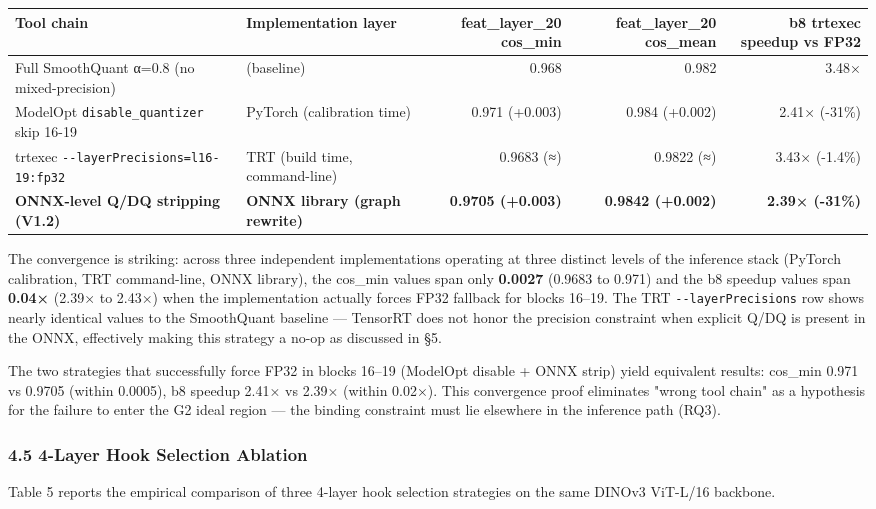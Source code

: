\documentclass[
]{article}
\newcounter{none} %
\begin{document}
{\def\LTcaptype{none} %
\begin{longtable}[]{@{}llrrr@{}}
\toprule\noalign{}
Tool chain & Implementation layer & feat\_layer\_20 cos\_min &
feat\_layer\_20 cos\_mean & b8 trtexec speedup vs FP32 \\
\midrule\noalign{}
\endhead
\bottomrule\noalign{}
\endlastfoot
Full SmoothQuant α=0.8 (no mixed-precision) & (baseline) & 0.968 & 0.982
& 3.48× \\
ModelOpt \texttt{disable\_quantizer} skip 16-19 & PyTorch (calibration
time) & 0.971 (+0.003) & 0.984 (+0.002) & 2.41× (-31\%) \\
trtexec \texttt{-\/-layerPrecisions=l16-19:fp32} & TRT (build time,
command-line) & 0.9683 (≈) & 0.9822 (≈) & 3.43× (-1.4\%) \\
\textbf{ONNX-level Q/DQ stripping (V1.2)} & \textbf{ONNX library (graph
rewrite)} & \textbf{0.9705 (+0.003)} & \textbf{0.9842 (+0.002)} &
\textbf{2.39× (-31\%)} \\
\end{longtable}
}

The convergence is striking: across three independent implementations
operating at three distinct levels of the inference stack (PyTorch
calibration, TRT command-line, ONNX library), the cos\_min values span
only \textbf{0.0027} (0.9683 to 0.971) and the b8 speedup values span
\textbf{0.04×} (2.39× to 2.43×) when the implementation actually forces
FP32 fallback for blocks 16--19. The TRT \texttt{-\/-layerPrecisions}
row shows nearly identical values to the SmoothQuant baseline ---
TensorRT does not honor the precision constraint when explicit Q/DQ is
present in the ONNX, effectively making this strategy a no-op as
discussed in §5.

The two strategies that successfully force FP32 in blocks 16--19
(ModelOpt disable + ONNX strip) yield equivalent results: cos\_min 0.971
vs 0.9705 (within 0.0005), b8 speedup 2.41× vs 2.39× (within 0.02×).
This convergence proof eliminates "wrong tool chain" as a hypothesis for
the failure to enter the G2 ideal region --- the binding constraint must
lie elsewhere in the inference path (RQ3).

\subsubsection{4.5 4-Layer Hook Selection
Ablation}\label{45-4-layer-hook-selection-ablation}

Table 5 reports the empirical comparison of three 4-layer hook selection
strategies on the same DINOv3 ViT-L/16 backbone.
\end{document}
